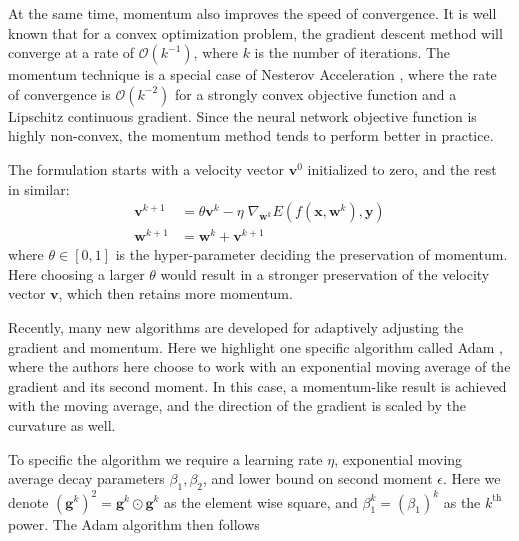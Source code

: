 At the same time, 
momentum also improves the speed of convergence.
It is well known that for a convex optimization problem,
the gradient descent method will converge at a rate 
of $\mathcal{O}(k^{-1})$, 
where $k$ is the number of iterations.
The momentum technique is a special case of 
Nesterov Acceleration \cite{Ne13},
where the rate of convergence is 
$\mathcal{O}(k^{-2})$ for a strongly convex 
objective function and a Lipschitz continuous gradient.
Since the neural network objective function is highly
non-convex, the momentum method tends to 
perform better in practice.

The formulation starts with a velocity vector $\mathbf{v}^0$
initialized to zero, and the rest in similar:
%
\begin{equation*}
\begin{aligned}
	\mathbf{v}^{k+1} &= \theta \mathbf{v}^{k} - \eta \; \nabla_{\mathbf{w}^k} 
				E\left(f(\mathbf{x},\mathbf{w}^k),\mathbf{y}\right) \\
	\mathbf{w}^{k+1} &= \mathbf{w}^{k} + \mathbf{v}^{k+1}
\end{aligned}
\end{equation*}
%
where $\theta \in [0,1]$ is the hyper-parameter 
deciding the preservation of momentum.
Here choosing a larger $\theta$ would result in a stronger 
preservation of the velocity vector $\mathbf{v}$,
which then retains more momentum.

Recently, many new algorithms are developed 
for adaptively adjusting the gradient and momentum.
Here we highlight one specific algorithm called 
Adam \cite{KiBa14}, where the authors here
choose to work with an exponential moving average
of the gradient and its second moment.
In this case, a momentum-like result is achieved 
with the moving average, 
and the direction of the gradient is scaled 
by the curvature as well.

To specific the algorithm we require
a learning rate $\eta$,
exponential moving average decay parameters
$\beta_1,\beta_2$,
and lower bound on second moment $\epsilon$.
Here we denote $(\mathbf{g}^k)^2 = \mathbf{g}^k \odot \mathbf{g}^k$
as the element wise square,
and $\beta_1^k = (\beta_1)^k$
as the $k^\text{th}$ power.
The Adam algorithm then follows

